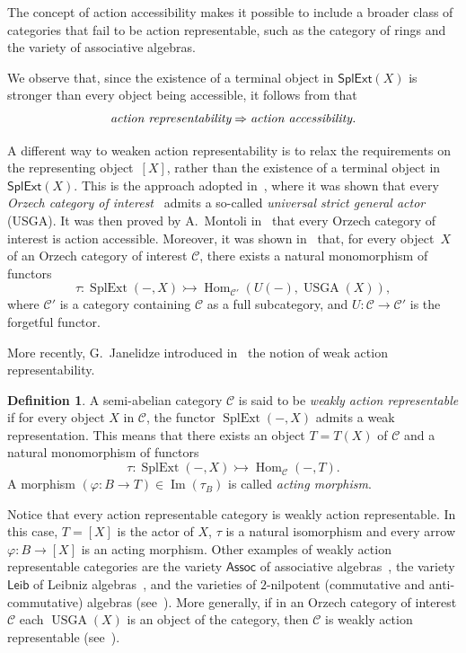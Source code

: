 \documentclass[reqno,hidelinks,a4paper]{amsart}
\theoremstyle{plain}
\theoremstyle{definition}
\newtheorem{definition}[subsection]{Definition}
\theoremstyle{remark}
\numberwithin{equation}{section}
\newcommand{\C}{\ensuremath{\mathcal{C}}}
\DeclareMathOperator{\Hom}{Hom}
\DeclareMathOperator{\SplExt}{SplExt}
\DeclareMathOperator{\Imm}{Im}
\DeclareMathOperator{\USGA}{USGA}
\newcommand{\Assoc}{\ensuremath{\mathsf{Assoc}}}
\newcommand{\Leib}{\ensuremath{\mathsf{Leib}}}
\newcommand{\SplExtX}{\ensuremath{\mathsf{SplExt}(X)}}
\begin{document}
The concept of action accessibility makes it possible to include a broader class of categories that fail to be action representable, such as the category of rings and the variety of associative algebras.

We observe that, since the existence of a terminal object in \(\SplExtX\) is stronger than every object being accessible, it follows from  that
\[
    \emph{action representability}\Rightarrow\emph{action accessibility.}
\]

A different way to weaken action representability is to relax the requirements on the representing object~\([X]\), rather than the existence of a terminal object in \(\SplExtX\). This is the approach adopted in~\cite{Casas}, where it was shown that every \emph{Orzech category of interest}~\cite{Orzech} admits a so-called \emph{universal strict general actor} (USGA). It was then proved by A.~Montoli in~\cite{Montoli} that every Orzech category of interest is action accessible. Moreover, it was shown in~\cite{CigoliManciniMetere} that, for every object~\(X\) of an Orzech category of interest \(\C\), there exists a natural monomorphism of functors
\[
    \tau \colon \SplExt(-,X) \rightarrowtail \Hom_{\C'}(U(-),\USGA(X)),
\]
where \(\C'\) is a category containing \(\C\) as a full subcategory, and \(U \colon \C \to \C'\) is the forgetful functor.

More recently, G.~Janelidze introduced in~\cite{WRA} the notion of weak action representability.

\begin{definition}\cite{WRA}
    A semi-abelian category \(\C\) is said to be \emph{weakly action representable} if for every object \(X\) in \(\C\), the functor \(\SplExt(-,X)\) admits a weak representation. This means that there exists an object \(T=T(X)\) of \(\C\) and a natural monomorphism of functors
    \[
        \tau\colon \SplExt(-,X) \rightarrowtail \Hom_{\C}(-,T).
    \]
    A morphism \((\varphi\colon B \to T) \in \Imm(\tau_B)\) is called \emph{acting morphism}.
\end{definition}

Notice that every action representable category is weakly action representable. In this case, \(T=[X]\) is the actor of \(X\), \(\tau\) is a natural isomorphism and every arrow \(\varphi\colon B \to [X]\) is an acting morphism. Other examples of weakly action representable categories are the variety \(\Assoc\) of associative algebras~\cite{WRA}, the variety \(\Leib\) of Leibniz algebras~\cite{CigoliManciniMetere}, and the varieties of \(2\)-nilpotent (commutative and anti-commutative) algebras (see~\cite{WRAAlg}). More generally, if in an Orzech category of interest \(\C\) each \(\USGA(X)\) is an object of the category, then \(\C\) is weakly action
representable (see~\cite[Corollary 4.2]{CigoliManciniMetere}).
\end{document}
